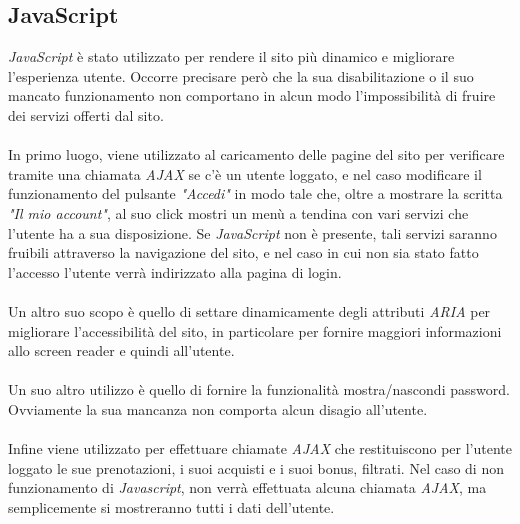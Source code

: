 \newpage
\subsection{JavaScript}
\textit{JavaScript} è stato utilizzato per rendere il sito più dinamico e migliorare l'esperienza utente.
Occorre precisare però che la sua disabilitazione o il suo mancato funzionamento non comportano in alcun
modo l'impossibilità di fruire dei servizi offerti dal sito.\\
\\
In primo luogo, viene utilizzato al caricamento delle pagine del sito per verificare tramite una
chiamata \textit{AJAX} se c'è un utente loggato, e nel caso modificare il funzionamento del pulsante
\textit{"Accedi"} in modo tale che, oltre a mostrare la scritta \textit{"Il mio account"}, al suo click
mostri un menù a tendina con vari servizi che l'utente ha a sua disposizione. Se \textit{JavaScript} non
è presente, tali servizi saranno fruibili attraverso la navigazione del sito, e nel caso in cui non sia
stato fatto l'accesso l'utente verrà indirizzato alla pagina di login.\\
\\
Un altro suo scopo è quello di settare dinamicamente degli attributi \textit{ARIA} per migliorare
l'accessibilità del sito, in particolare per fornire maggiori informazioni allo screen reader e quindi
all'utente.\\
\\
Un suo altro utilizzo è quello di fornire la funzionalità mostra/nascondi password. Ovviamente la sua
mancanza non comporta alcun disagio all'utente.\\
\\
Infine viene utilizzato per effettuare chiamate \textit{AJAX} che restituiscono per l'utente loggato le
sue prenotazioni, i suoi acquisti e i suoi bonus, filtrati. Nel caso di non funzionamento di
\textit{Javascript}, non verrà effettuata alcuna chiamata \textit{AJAX}, ma semplicemente si mostreranno
tutti i dati dell'utente.